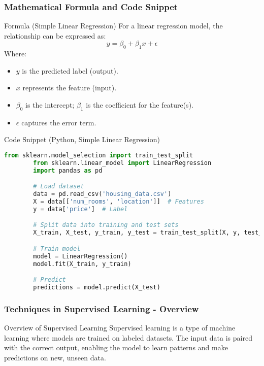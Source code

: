 \documentclass[aspectratio=169]{beamer}
\begin{document}
\begin{frame}[fragile]
    \frametitle{Mathematical Formula and Code Snippet}
    \begin{block}{Formula (Simple Linear Regression)}
        For a linear regression model, the relationship can be expressed as:
        \begin{equation}
            y = \beta_0 + \beta_1 x + \epsilon
        \end{equation}
        Where:
        \begin{itemize}
            \item $y$ is the predicted label (output).
            \item $x$ represents the feature (input).
            \item $\beta_0$ is the intercept; $\beta_1$ is the coefficient for the feature(s).
            \item $\epsilon$ captures the error term.
        \end{itemize}
    \end{block}

    \begin{block}{Code Snippet (Python, Simple Linear Regression)}
        \begin{lstlisting}[language=Python]
        from sklearn.model_selection import train_test_split
        from sklearn.linear_model import LinearRegression
        import pandas as pd

        # Load dataset
        data = pd.read_csv('housing_data.csv')
        X = data[['num_rooms', 'location']]  # Features
        y = data['price']  # Label

        # Split data into training and test sets
        X_train, X_test, y_train, y_test = train_test_split(X, y, test_size=0.2, random_state=42)

        # Train model
        model = LinearRegression()
        model.fit(X_train, y_train)

        # Predict
        predictions = model.predict(X_test)
        \end{lstlisting}
    \end{block}
\end{frame}

\begin{frame}[fragile]
  \frametitle{Techniques in Supervised Learning - Overview}
  \begin{block}{Overview of Supervised Learning}
    Supervised learning is a type of machine learning where models are trained on labeled datasets. The input data is paired with the correct output, enabling the model to learn patterns and make predictions on new, unseen data.
  \end{block}
\end{frame}
\end{document}
